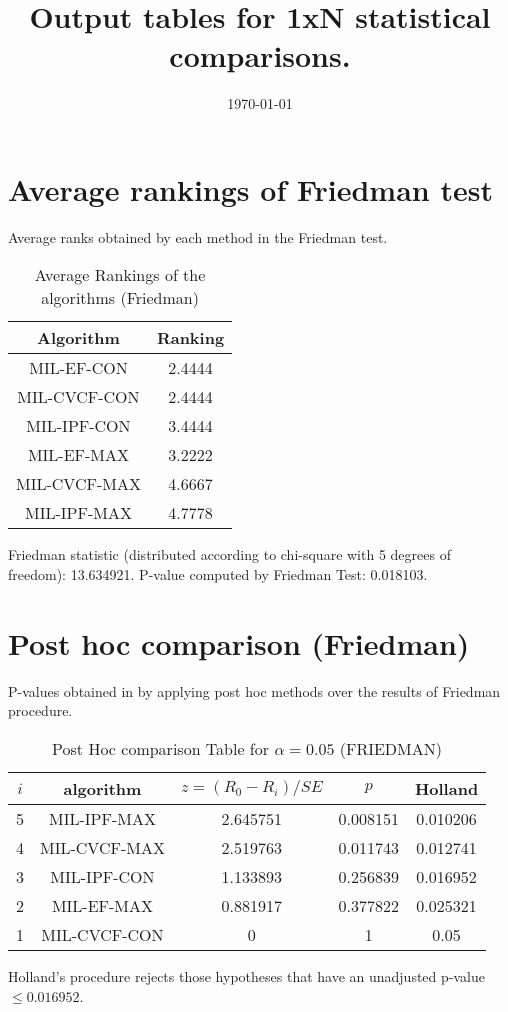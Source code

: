 \documentclass[a4paper,10pt]{article}
\title{Output tables for 1xN statistical comparisons.}
\author{}
\date{\today}
\begin{document}
\begin{landscape}
\pagestyle{empty}
\maketitle
\thispagestyle{empty}

\section{Average rankings of Friedman test}


Average ranks obtained by each method in the Friedman test.

\begin{table}[!htp]
\centering
\begin{tabular}{|c|c|}\hline
Algorithm&Ranking\\\hline
MIL-EF-CON&2.4444\\MIL-CVCF-CON&2.4444\\MIL-IPF-CON&3.4444\\MIL-EF-MAX&3.2222\\MIL-CVCF-MAX&4.6667\\MIL-IPF-MAX&4.7778\\\hline\end{tabular}
\caption{Average Rankings of the algorithms (Friedman)}
\end{table}

Friedman statistic (distributed according to chi-square with 5 degrees of freedom): 13.634921. \newline P-value computed by Friedman Test: 0.018103.\newline


\newpage

\section{Post hoc comparison (Friedman)}


P-values obtained in by applying post hoc methods over the results of Friedman procedure.

\begin{table}[!htp]
\centering\footnotesize
\begin{tabular}{ccccc}
$i$&algorithm&$z=(R_0 - R_i)/SE$&$p$&Holland\\
\hline5&MIL-IPF-MAX&2.645751&0.008151&0.010206\\4&MIL-CVCF-MAX&2.519763&0.011743&0.012741\\3&MIL-IPF-CON&1.133893&0.256839&0.016952\\2&MIL-EF-MAX&0.881917&0.377822&0.025321\\1&MIL-CVCF-CON&0&1&0.05\\\hline
\end{tabular}
\caption{Post Hoc comparison Table for $\alpha=0.05$ (FRIEDMAN)}
\end{table}Holland's procedure rejects those hypotheses that have an unadjusted p-value $\le0.016952$.



\end{landscape}
\end{document}
